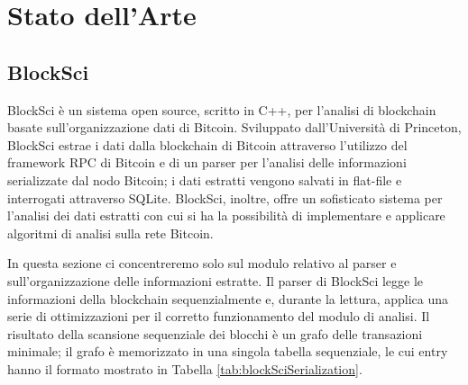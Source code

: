 \chapter{Stato dell'Arte}\label{chap:riferimentiStrotici}


\section{BlockSci} \label{sec:riferimentiStorici}

BlockSci \cite{DBLP:journals/corr/abs-1709-02489} è un sistema open source, scritto in C++, per l'analisi di blockchain basate sull'organizzazione dati di Bitcoin. Sviluppato dall'Università di Princeton, BlockSci estrae i dati dalla blockchain di Bitcoin attraverso l'utilizzo del framework RPC di Bitcoin e di un parser per l'analisi delle informazioni serializzate dal nodo Bitcoin; i dati estratti vengono salvati in flat-file e interrogati attraverso SQLite.
BlockSci, inoltre, offre un sofisticato sistema per l'analisi dei dati estratti con cui si ha la possibilità di implementare e applicare algoritmi di analisi sulla rete Bitcoin.

In questa sezione ci concentreremo  solo sul modulo relativo al parser e sull'organizzazione delle informazioni estratte. Il parser di BlockSci legge le informazioni della blockchain sequenzialmente e, durante la lettura, applica  una serie di ottimizzazioni per il corretto funzionamento del modulo di analisi.
Il risultato della scansione sequenziale dei blocchi è un grafo delle transazioni minimale; il grafo è memorizzato in una singola tabella sequenziale, le cui entry hanno il formato mostrato in Tabella \ref{tab:blockSciSerialization}.

